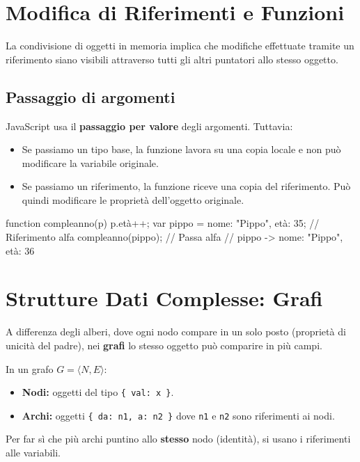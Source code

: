 \section{Modifica di Riferimenti e Funzioni}
La condivisione di oggetti in memoria implica che modifiche effettuate tramite un riferimento siano visibili attraverso tutti gli altri puntatori allo stesso oggetto.

\subsection{Passaggio di argomenti}
JavaScript usa il \textbf{passaggio per valore} degli argomenti. Tuttavia:
\begin{itemize}
    \item Se passiamo un tipo base, la funzione lavora su una copia locale e non può modificare la variabile originale.
    \item Se passiamo un riferimento, la funzione riceve una copia del riferimento. Può quindi modificare le proprietà dell'oggetto originale.
\end{itemize}

\begin{jsbox}[title={Modifica Oggetto Riferito}]
function compleanno(p) { p.età++; }
var pippo = {nome: "Pippo", età: 35}; // Riferimento alfa
compleanno(pippo); // Passa alfa
// pippo -> {nome: "Pippo", età: 36}
\end{jsbox}

\section{Strutture Dati Complesse: Grafi}
A differenza degli alberi, dove ogni nodo compare in un solo posto (proprietà di unicità del padre), nei \textbf{grafi} lo stesso oggetto può comparire in più campi.

\begin{definition}[title={Identità nel Grafo}]
In un grafo $G = \langle N, E \rangle$:
\begin{itemize}
    \item \textbf{Nodi:} oggetti del tipo \texttt{\{ val: x \}}.
    \item \textbf{Archi:} oggetti \texttt{\{ da: n1, a: n2 \}} dove \texttt{n1} e \texttt{n2} sono riferimenti ai nodi.
\end{itemize}
Per far sì che più archi puntino allo \textbf{stesso} nodo (identità), si usano i riferimenti alle variabili.
\end{definition}


